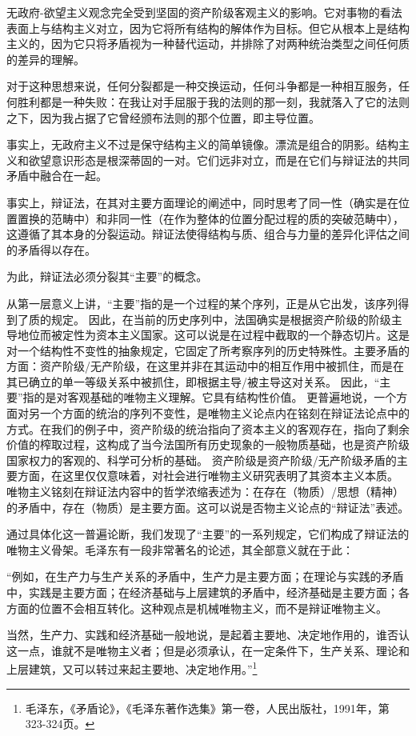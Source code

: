 \documentclass[fontset=fandol, a4paper, 12pt, twoside]{ctexart}
\renewenvironment{quote}
  {\list{}{\rightmargin=0cm \leftmargin=2em}%
   \item\relax\small\kaishu\color{black}}
  {\endlist}
\begin{document}
无政府-欲望主义观念完全受到坚固的资产阶级客观主义的影响。它对事物的看法表面上与结构主义对立，因为它将所有结构的解体作为目标。但它从根本上是结构主义的，因为它只将矛盾视为一种替代运动，并排除了对两种统治类型之间任何质的差异的理解。

对于这种思想来说，任何分裂都是一种交换运动，任何斗争都是一种相互服务，任何胜利都是一种失败：在我让对手屈服于我的法则的那一刻，我就落入了它的法则之下，因为我占据了它曾经颁布法则的那个位置，即主导位置。

事实上，无政府主义不过是保守结构主义的简单镜像。漂流是组合的阴影。结构主义和欲望意识形态是根深蒂固的一对。它们远非对立，而是在它们与辩证法的共同矛盾中融合在一起。

事实上，辩证法，在其对主要方面理论的阐述中，同时思考了同一性（确实是在位置置换的范畴中）和非同一性（在作为整体的位置分配过程的质的突破范畴中），这遵循了其本身的分裂运动。辩证法使得结构与质、组合与力量的差异化评估之间的矛盾得以存在。

为此，辩证法必须分裂其“主要”的概念。

从第一层意义上讲，“主要”指的是一个过程的某个序列，正是从它出发，该序列得到了质的规定。
因此，在当前的历史序列中，法国确实是根据资产阶级的阶级主导地位而被定性为资本主义国家。这可以说是在过程中截取的一个静态切片。这是对一个结构性不变性的抽象规定，它固定了所考察序列的历史特殊性。主要矛盾的方面：资产阶级/无产阶级，在这里并非在其运动中的相互作用中被抓住，而是在其已确立的单一等级关系中被抓住，即根据主导/被主导这对关系。
因此，“主要”指的是对客观基础的唯物主义理解。它具有结构性价值。
更普遍地说，一个方面对另一个方面的统治的序列不变性，是唯物主义论点内在铭刻在辩证法论点中的方式。在我们的例子中，资产阶级的统治指向了资本主义的客观存在，指向了剩余价值的榨取过程，这构成了当今法国所有历史现象的一般物质基础，也是资产阶级国家权力的客观的、科学可分析的基础。
资产阶级是资产阶级/无产阶级矛盾的主要方面，在这里仅仅意味着，对社会进行唯物主义研究表明了其资本主义本质。
唯物主义铭刻在辩证法内容中的哲学浓缩表述为：在存在（物质）/思想（精神）的矛盾中，存在（物质）是主要方面。这可以说是否物主义论点的“辩证法”表述。

通过具体化这一普遍论断，我们发现了“主要”的一系列规定，它们构成了辩证法的唯物主义骨架。毛泽东有一段非常著名的论述，其全部意义就在于此：

\begin{quote}
“例如，在生产力与生产关系的矛盾中，生产力是主要方面；在理论与实践的矛盾中，实践是主要方面；在经济基础与上层建筑的矛盾中，经济基础是主要方面；各方面的位置不会相互转化。这种观点是机械唯物主义，而不是辩证唯物主义。

当然，生产力、实践和经济基础一般地说，是起着主要地、决定地作用的，谁否认这一点，谁就不是唯物主义者；但是必须承认，在一定条件下，生产关系、理论和上层建筑，又可以转过来起主要地、决定地作用。”\footnote{毛泽东，《矛盾论》，《毛泽东著作选集》第一卷，人民出版社，1991年，第323-324页。}
\end{quote}
\end{document}
